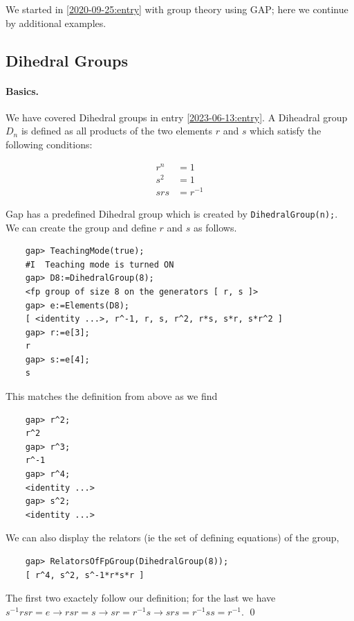 
We started in \ref{2020-09-25:entry} with group theory using GAP; here we continue by additional examples.

\subsection{Dihedral Groups}

\paragraph{Basics.} We have covered Dihedral groups in entry \ref{2023-06-13:entry}. A Diheadral group $D_n$ is defined as all products of the two elements $r$ and $s$ which satisfy the following conditions:

\begin{align*}
r^n &= 1 \\
s^2 &= 1 \\
srs &= r^{-1}
\end{align*}

Gap has a predefined Dihedral group which is created by \verb+DihedralGroup(n);+. We can create the group and define $r$ and $s$ as follows.

\begin{verbatim}
    gap> TeachingMode(true);
    #I  Teaching mode is turned ON
    gap> D8:=DihedralGroup(8);
    <fp group of size 8 on the generators [ r, s ]>
    gap> e:=Elements(D8);
    [ <identity ...>, r^-1, r, s, r^2, r*s, s*r, s*r^2 ]
    gap> r:=e[3];
    r
    gap> s:=e[4];
    s
\end{verbatim}

This matches the definition from above as we find

\begin{verbatim}
    gap> r^2;
    r^2
    gap> r^3;
    r^-1
    gap> r^4;
    <identity ...>
    gap> s^2;
    <identity ...>
\end{verbatim}

We can also display the relators (ie the set of defining equations) of the group,

\begin{verbatim}
	gap> RelatorsOfFpGroup(DihedralGroup(8));
	[ r^4, s^2, s^-1*r*s*r ]
\end{verbatim}

The first two exactely follow our definition; for the last we have $s^{-1}rsr = e \rightarrow rsr = s \rightarrow sr = r^{-1}s \rightarrow srs = r^{-1}ss = r^{-1}$. \qed


